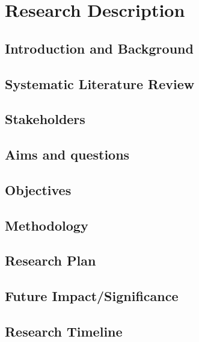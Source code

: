 \chapter{Research Description}\label{ch:Intro}

\section{Introduction and Background}\label{sec:disBackground}


\section{Systematic Literature Review}\label{sec:disSLR}


\section{Stakeholders}\label{sec:disStakeholders}


\section{Aims and questions}\label{sec:disAims}


\section{Objectives}\label{sec:disObjectives}


\section{Methodology}\label{sec:disMethodology}


\section{Research Plan}\label{sec:disResearchPlan}


\section{Future Impact/Significance}\label{sec:disFutureImpact}


\pagebreak

\section{Research Timeline}\label{sec:disResearchTimeline}














